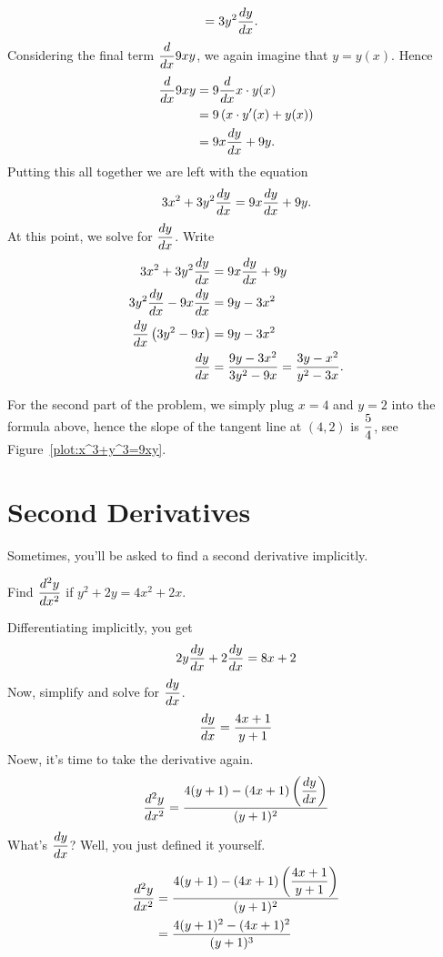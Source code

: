 \begin{example}
\begin{solution}
\begin{align*}
        &= 3y^2\displaystyle\frac{dy}{dx}.
        \end{align*}
        Considering the final term $\displaystyle\frac{d}{dx} 9xy$, we again imagine that $y=y(x)$. Hence 
        \begin{align*}
        \displaystyle\frac{d}{dx} 9xy &= 9\displaystyle\frac{d}{dx} x\cdot y(x) \\
        &= 9 \left(x\cdot y'(x) + y(x)\right)\\
        &= 9x \displaystyle\frac{dy}{dx} + 9y.
        \end{align*}
        Putting this all together we are left with the equation
        \[
        3x^2 + 3y^2\displaystyle\frac{dy}{dx} =9x \displaystyle\frac{dy}{dx} + 9y.
        \]
        At this point, we solve for $\displaystyle\frac{dy}{dx}$. Write
        \begin{align*}
        3x^2 + 3y^2\displaystyle\frac{dy}{dx} &= 9x \displaystyle\frac{dy}{dx} + 9y\\
        3y^2\displaystyle\frac{dy}{dx} -  9x \displaystyle\frac{dy}{dx} &= 9y - 3x^2\\
        \displaystyle\frac{dy}{dx}\left(3y^2-9x\right)&= 9y - 3x^2\\
        \displaystyle\frac{dy}{dx} &=\frac{9y - 3x^2}{3y^2-9x} = \frac{3y - x^2}{y^2-3x}.
        \end{align*}
        
        For the second part of the problem, we simply plug $x=4$ and $y=2$
        into the formula above, hence the slope of the tangent line at $(4,2)$
        is $\displaystyle\frac{5}{4}$, see Figure~\ref{plot:x^3+y^3=9xy}.
    \end{solution}
\end{example}

\section{Second Derivatives}
Sometimes, you'll be asked to find a second derivative implicitly.

\begin{example}
    Find $\displaystyle\frac{d^2y}{dx^2}$ if $y^2+2y=4x^2+2x$. \cite{ap}\\
    \begin{solution}
        Differentiating implicitly, you get
        \[2y\displaystyle\frac{dy}{dx}+2\displaystyle\frac{dy}{dx}=8x+2\]
        Now, simplify and solve for $\displaystyle\frac{dy}{dx}$.
        \[\displaystyle\frac{dy}{dx}=\dfrac{4x+1}{y+1}\]
        Noew, it's time to take the derivative again.
        \[\displaystyle\frac{d^2y}{dx^2}=\dfrac{4(y+1)-(4x+1)\left(\displaystyle\frac{dy}{dx}\right)}{(y+1)^2}\]
        What's $\displaystyle\frac{dy}{dx}$? Well, you just defined it yourself.
        \begin{align*}
            \displaystyle\frac{d^2y}{dx^2}
            &=\dfrac{4(y+1)-(4x+1)\left(\dfrac{4x+1}{y+1}\right)}{(y+1)^2}\\
            &=\dfrac{4(y+1)^2-(4x+1)^2}{(y+1)^3}
        \end{align*}
    \end{solution}
\end{example}

